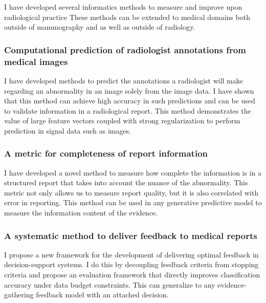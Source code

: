 I have developed several informatics methods to measure and improve upon radiological practice These methods can be extended to medical domains both outside of mammography and as well as outside of radiology. 

\subsubsection{Computational prediction of radiologist annotations from medical images}
I have developed methods to predict the annotations a radiologist will make regarding an abnormality in an image solely from the image data. I have shown that this method can achieve high accuracy in such predictions and can be used to validate information in a radiological report. This method demonstrates the value of large feature vectors coupled with strong regularization to perform prediction in signal data such as images.

\subsubsection{A metric for completeness of report information}
I have developed a novel method to measure how complete the information is in a structured report that takes into account the nuance of the abnormality. This metric not only allows us to measure report quality, but it is also correlated with error in reporting. This method can be used in any generative predictive model to measure the information content of the evidence.

\subsubsection{A systematic method to deliver feedback to medical reports}
I propose a new framework for the development of delivering optimal feedback in decision-support systems. I do this by decoupling feedback criteria from stopping criteria and propose an evaluation framework that directly improves classification accuracy under data budget constraints. This can generalize to any evidence-gathering feedback model with an attached decision.